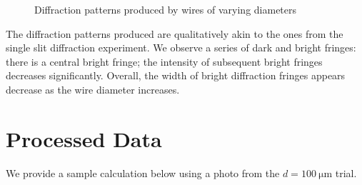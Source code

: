\documentclass[a4paper, 12pt]{article}
\begin{document}
\begin{figure}[H]
\centering
\end{figure}
\begin{figure}[H]
\ContinuedFloat
\centering

    
    
    
    \caption{Diffraction patterns produced by wires of varying diameters}
\end{figure}

The diffraction patterns produced are qualitatively akin to the ones from the single slit diffraction experiment. 
We observe a series of dark and bright fringes: 
there is a central bright fringe; 
the intensity of subsequent bright fringes decreases significantly. 
Overall, the width of bright diffraction fringes appears decrease as the wire diameter increases. 

\section{Processed Data}
We provide a sample calculation below using a photo from the $d = \SI{100}{\um}$ trial.
\end{document}

